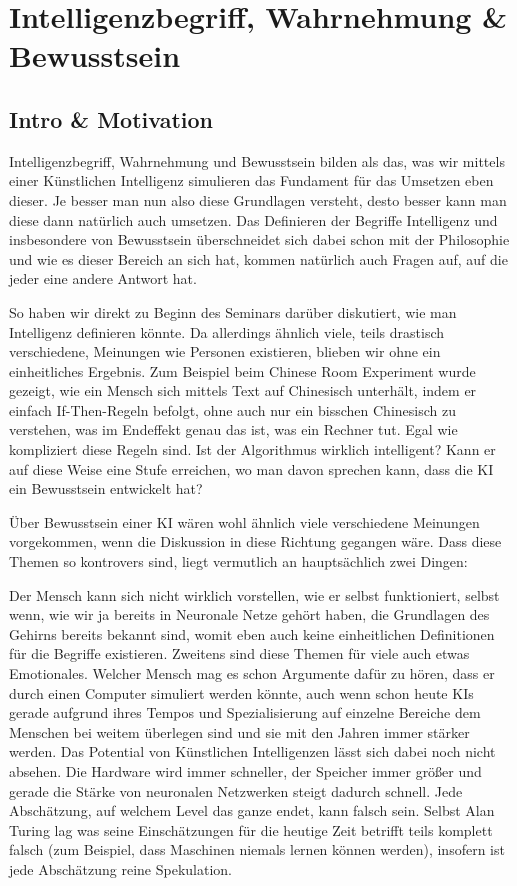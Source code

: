 
\chapter{Intelligenzbegriff, Wahrnehmung \& Bewusstsein}
\section{Intro \& Motivation}
Intelligenzbegriff, Wahrnehmung und Bewusstsein bilden als das, was wir mittels einer Künstlichen Intelligenz simulieren das Fundament für das Umsetzen eben dieser.
Je besser man nun also diese Grundlagen versteht, desto besser kann man diese dann natürlich auch umsetzen.
Das Definieren der Begriffe  Intelligenz und insbesondere von Bewusstsein überschneidet sich dabei schon mit der Philosophie und wie es dieser Bereich an sich hat, kommen natürlich auch Fragen auf, auf die jeder eine andere Antwort hat.

So haben wir direkt zu Beginn des Seminars darüber diskutiert, wie man Intelligenz definieren könnte.
Da allerdings ähnlich viele, teils drastisch verschiedene, Meinungen wie Personen existieren, blieben wir ohne ein einheitliches Ergebnis.
Zum Beispiel beim Chinese Room Experiment wurde gezeigt, wie ein Mensch sich mittels Text auf Chinesisch unterhält, indem er einfach If-Then-Regeln befolgt, ohne auch nur ein bisschen Chinesisch zu verstehen, was im Endeffekt genau das ist, was ein Rechner tut.
Egal wie kompliziert diese Regeln sind.
Ist der Algorithmus wirklich intelligent? Kann er auf diese Weise eine Stufe erreichen, wo man davon sprechen kann, dass die KI ein Bewusstsein entwickelt hat?

Über Bewusstsein einer KI wären wohl ähnlich viele verschiedene Meinungen vorgekommen, wenn die Diskussion in diese Richtung gegangen wäre.
Dass diese Themen so kontrovers sind, liegt vermutlich an hauptsächlich zwei Dingen:

Der Mensch kann sich nicht wirklich vorstellen, wie er selbst funktioniert, selbst wenn, wie wir ja bereits in Neuronale Netze gehört haben, die Grundlagen des Gehirns bereits bekannt sind, womit eben auch keine einheitlichen Definitionen für die Begriffe existieren.
Zweitens sind diese Themen für viele auch etwas Emotionales.
Welcher Mensch mag es schon Argumente dafür zu hören, dass er durch einen Computer simuliert werden könnte, auch wenn schon heute KIs gerade aufgrund ihres Tempos und Spezialisierung auf einzelne Bereiche dem Menschen bei weitem überlegen sind und sie mit den Jahren immer stärker werden.
Das Potential von Künstlichen Intelligenzen lässt sich dabei noch nicht absehen.
Die Hardware wird immer schneller, der Speicher immer größer und gerade die Stärke von neuronalen Netzwerken steigt dadurch schnell.
Jede Abschätzung, auf welchem Level das ganze endet, kann falsch sein.
Selbst Alan Turing lag was seine Einschätzungen für die heutige Zeit betrifft teils komplett falsch (zum Beispiel, dass Maschinen niemals lernen können werden), insofern ist jede Abschätzung reine Spekulation.

